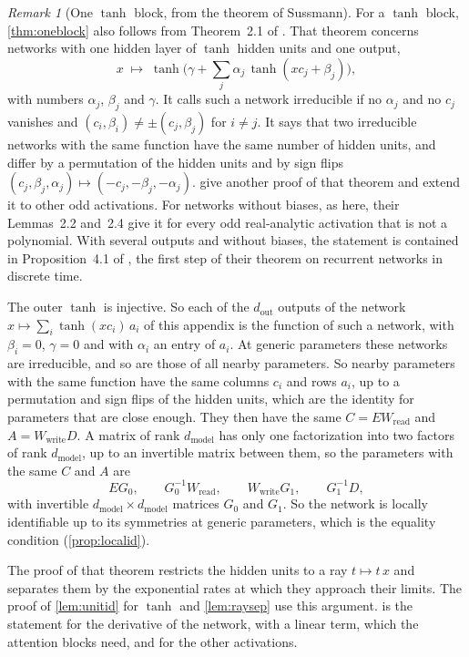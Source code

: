 \documentclass[10pt]{article}
\theoremstyle{definition}
\theoremstyle{remark}
\newtheorem{remark}[theorem]{Remark}
\newcommand{\Wread}{W_{\mathrm{read}}}
\newcommand{\Wwrite}{W_{\mathrm{write}}}
\newcommand{\dm}{d_{\mathrm{model}}}
\begin{document}
\begin{remark}[One $\tanh$ block, from the theorem of Sussmann]\label{rem:sussmann}
For a $\tanh$ block, \cref{thm:oneblock} also follows from Theorem~2.1 of \citet{sussmann1992}. That theorem concerns networks with one hidden layer of $\tanh$ hidden units and one output,
\[
x \;\mapsto\; \tanh\Big(\gamma + \sum_{j}\alpha_j\,\tanh(xc_j + \beta_j)\Big),
\]
with numbers $\alpha_j$, $\beta_j$ and $\gamma$. It calls such a network irreducible if no $\alpha_j$ and no $c_j$ vanishes and $(c_i, \beta_i) \neq \pm(c_j, \beta_j)$ for $i \neq j$. It says that two irreducible networks with the same function have the same number of hidden units, and differ by a permutation of the hidden units and by sign flips $(c_j, \beta_j, \alpha_j) \mapsto (-c_j, -\beta_j, -\alpha_j)$. \citet{albertini1993uniqueness} give another proof of that theorem and extend it to other odd activations. For networks without biases, as here, their Lemmas~2.2 and~2.4 give it for every odd real-analytic activation that is not a polynomial. With several outputs and without biases, the statement is contained in Proposition~4.1 of \citet{albertini1993discrete}, the first step of their theorem on recurrent networks in discrete time.

The outer $\tanh$ is injective. So each of the $d_{\mathrm{out}}$ outputs of the network $x \mapsto \sum_i \tanh(xc_i)\,a_i$ of this appendix is the function of such a network, with $\beta_i = 0$, $\gamma = 0$ and with $\alpha_i$ an entry of $a_i$. At generic parameters these networks are irreducible, and so are those of all nearby parameters. So nearby parameters with the same function have the same columns $c_i$ and rows $a_i$, up to a permutation and sign flips of the hidden units, which are the identity for parameters that are close enough. They then have the same $C = E\Wread$ and $A = \Wwrite D$. A matrix of rank $\dm$ has only one factorization into two factors of rank $\dm$, up to an invertible matrix between them, so the parameters with the same $C$ and $A$ are
\[
EG_0, \qquad G_0^{-1}\Wread, \qquad \Wwrite G_1, \qquad G_1^{-1}D,
\]
with invertible $\dm\times\dm$ matrices $G_0$ and $G_1$. So the network is locally identifiable up to its symmetries at generic parameters, which is the equality condition (\cref{prop:localid}).

The proof of that theorem restricts the hidden units to a ray $t \mapsto t\,x$ and separates them by the exponential rates at which they approach their limits. The proof of \cref{lem:unitid} for $\tanh$ and \cref{lem:raysep} use this argument.  is the statement for the derivative of the network, with a linear term, which the attention blocks need, and for the other activations.
\end{remark}
\end{document}
